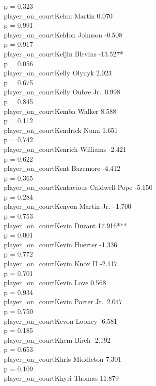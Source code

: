 \documentclass[
  landscape]{article}
\begin{document}
p = 0.323\\
player\_on\_courtKelan Martin 0.070\\
p = 0.991\\
player\_on\_courtKeldon Johnson -0.508\\
p = 0.917\\
player\_on\_courtKeljin Blevins -13.527*\\
p = 0.056\\
player\_on\_courtKelly Olynyk 2.023\\
p = 0.675\\
player\_on\_courtKelly Oubre Jr.~0.998\\
p = 0.845\\
player\_on\_courtKemba Walker 8.588\\
p = 0.112\\
player\_on\_courtKendrick Nunn 1.651\\
p = 0.742\\
player\_on\_courtKenrich Williams -2.421\\
p = 0.622\\
player\_on\_courtKent Bazemore -4.412\\
p = 0.365\\
player\_on\_courtKentavious Caldwell-Pope -5.150\\
p = 0.284\\
player\_on\_courtKenyon Martin Jr.~-1.700\\
p = 0.753\\
player\_on\_courtKevin Durant 17.916***\\
p = 0.001\\
player\_on\_courtKevin Huerter -1.336\\
p = 0.772\\
player\_on\_courtKevin Knox II -2.117\\
p = 0.701\\
player\_on\_courtKevin Love 0.568\\
p = 0.934\\
player\_on\_courtKevin Porter Jr.~2.047\\
p = 0.750\\
player\_on\_courtKevon Looney -6.581\\
p = 0.185\\
player\_on\_courtKhem Birch -2.192\\
p = 0.653\\
player\_on\_courtKhris Middleton 7.301\\
p = 0.109\\
player\_on\_courtKhyri Thomas 11.879\\
\end{document}
